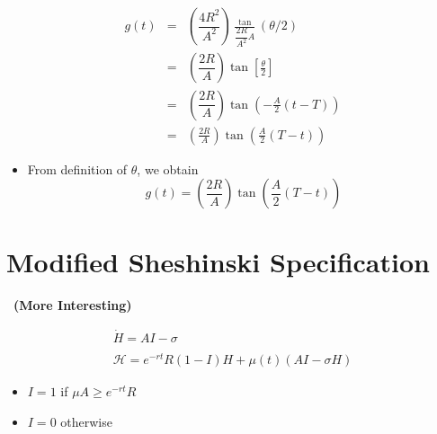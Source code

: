 \documentclass[12pt,compress,handout]{beamer}  %
\begin{document}
\begin{frame}
\begin{eqnarray*}
g(t) &=&\left( \dfrac{4R^2}{A^2}\right) \frac{\tan
}{\dfrac{2R}{A^2}A}(\theta /2) \\
&=&\left( \dfrac{2R}A\right) \tan \left[ \frac \theta 2\right] \\
&=&\left( \dfrac{2R}A\right)\tan \left( -\frac A2(t-T)\right) \\
&=&\left( \frac{2R}A\right) \tan \left( \frac A2(T-t)\right)
\end{eqnarray*}

\begin{itemize}[<+->]
\item From definition of $\theta$, we obtain
\begin{equation*}
g(t)=\left(\frac{2R}{A}\right)\tan \left( \frac{A}{2}(T-t)\right)
\end{equation*}
\end{itemize}
\end{frame}


\section{Modified Sheshinski Specification}
\begin{frame}
\begin{center}
\textbf{\insertsection\ (More Interesting)}
\end{center}
\begin{gather*}
\dot{H}=AI-\sigma \\
\\
\mathcal{H}=e^{-rt}R(1-I)H+\mu (t)(AI-\sigma H)
\end{gather*}

\begin{itemize}[<+->]
\item $I=1$ if $\mu A \geq e^{-rt}R$
\item $I=0$ otherwise
\end{itemize}
\end{frame}
\end{document}
